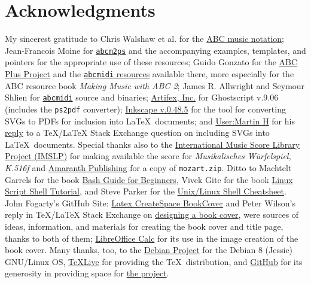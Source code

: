 \documentclass[letterpaper,x11names,svgnames,10pt]{article}
\begin{document}
{\section{Acknowledgments}
My sincerest gratitude to Chris Walshaw et al. for the \hyperref{http://www.abcnotation.com/}{}{}{ABC music notation}; Jean-Francois Moine for \hyperref{http://moinejf.free.fr/}{}{}{\tt abcm2ps} and the accompanying examples, templates, and pointers for the appropriate use of these resources; Guido Gonzato for the \hyperref{http://abcplus.sourceforge.net/}{}{}{ABC Plus Project} and the \hyperref{http://abcplus.sourceforge.net/#abcMIDI}{}{}{{\tt abcmidi} resources} available there, more especially for the ABC resource book {\em Making Music with ABC 2}; James R. Allwright and Seymour Shlien for \hyperref{http://abc.sourceforge.net/abcMIDI}{}{}{\tt abcmidi} source and binaries; \hyperref{https://artifex.com/}{}{}{Artifex, Inc.} for Ghostscript v.9.06 (includes the {\tt ps2pdf} converter); \hyperref{https://www.inkscape.org/}{}{}{Inkscape v.0.48.5} for the tool for converting SVGs to PDFs for inclusion into \LaTeX\ documents; and \hyperref{https://tex.stackexchange.com/users/632/martin-h}{}{}{User:Martin H} for his \hyperref{https://tex.stackexchange.com/questions/2099/how-to-include-svg-diagrams-in-latex}{}{}{reply} to a TeX/LaTeX Stack Exchange question on including SVGs into \LaTeX\ documents. Special thanks also to the \hyperref{http://imslp.org/}{}{}{International Music Score Library Project (IMSLP)} for making available the score for {\em Musikalisches W\"{u}rfelspiel, K.516f} and \hyperref{http://www.amaranthpublishing.com/MozartDiceGame.htm}{}{}{Amaranth Publishing} for a copy of {\tt mozart.zip}. Ditto to Machtelt Garrels for the book \hyperref{http://tldp.org/LDP/Bash-Beginners-Guide/html/Bash-Beginners-Guide.html}{}{}{Bash Guide for Beginners}, Vivek Gite for the book \hyperref{http://www.freeos.com/guides/lsst/}{}{}{Linux Script Shell Tutorial}, and Steve Parker for the \hyperref{http://steve-parker.org/sh/cheatsheet.pdf}{}{}{Unix/Linux Shell Cheatsheet}. John Fogarty's GitHub Site: \hyperref{https://github.com/jfogarty/latex-createspace-bookcover}{}{}{Latex CreateSpace BookCover} and Peter Wilson's reply in TeX/LaTeX Stack Exchange on \hyperref{https://How\%20can\%20I\%20design\%20a\%20book\%20cover\%3F\%20-\%20TeX\%20-\%20LaTeX\%20Stack\%20Exchange.html}{}{}{designing a book cover}, were sources of ideas, information, and materials for creating the book cover and title page, thanks to both of them; \hyperref{http://www.libreoffice.org/}{}{}{LibreOffice Calc} for its use in the image creation of the book cover.  Many thanks, too, to the \hyperref{https://www.debian.org}{}{}{Debian Project} for the Debian 8 (Jessie) GNU/Linux OS, \hyperref{http://www.tug.org/texlive/}{}{}{TeXLive} for providing the \TeX\ distribution,  and \hyperref{https://github.org}{}{}{GitHub} for its generosity in providing space for \hyperref{https://github.com/justineuro/mdgBookSVGv1}{}{}{the project}.  

}
\end{document}

